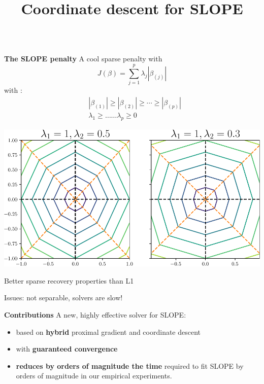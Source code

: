 \documentclass[english,final,t]{beamer}
\title{
	Coordinate descent for SLOPE}
\author{%
\texorpdfstring{
	\begin{minipage}{.7\linewidth}
	\begin{columns}%
		\column{.3\linewidth}
		\centering
		\Large Johan Larsson \\
		\large Mila \& Université de Montréal
		\column{.3\linewidth}
		\centering
		\Large Quentin Klopfenstein \\
		\large Université du Luxembourg
		\column{.28\linewidth}
		\centering
		\Large Mathurin Massias \\
		\large Univ. Lyon, Inria, CNRS, ENS de Lyon
		\centering
		\Large Jonas Wallin \\
		\large Univ. Lyon, Inria, CNRS, ENS de Lyon
	\end{columns}
	\vspace{1em}
\end{minipage}}{}
}
\begin{document}
\begin{frame}{}
\begin{columns}[t]
	\begin{column}{.3\linewidth}
		\begin{block}{\textbf{\color{malgared} The SLOPE penalty}}
			\justifying
			A cool sparse penalty with \textbf{\color{malgared}{built-in coefficients clustering}}
	\begin{equation*}
		J(\beta) = \sum_{j=1}^p \lambda_j|\beta_{(j)}|
    \end{equation*}
    with :
\begin{align*}
  &|\beta_{(1)}| \geq |\beta_{(2)}| \geq \cdots \geq |\beta_{(p)}|  \\
  &\lambda_1 \geq \ldots \ldots \lambda_p \geq 0
\end{align*}

\begin{center}
	\includegraphics[width=0.8\linewidth]{./images/slope
	}
\end{center}

Better sparse recovery properties than L1

Issues: not separable, solvers are slow!

	\end{block}
	\begin{block}{\textbf{\color{malgared} Contributions}}
			A new, highly effective solver for SLOPE:
			\vspace{1em}
			\begin{itemize}
				\item  based on \textbf{\color{malgared}hybrid} proximal gradient and coordinate descent
				\item  with \textbf{\color{malgared}guaranteed convergence}
				\item  \textbf{\color{malgared}reduces by orders of magnitude the time}
				required to fit SLOPE by orders of magnitude in our empirical experiments.
			\end{itemize}
	\end{block}


\end{column}
\end{columns}
\end{frame}
\end{document}
